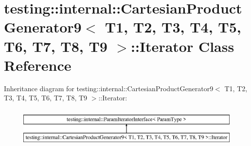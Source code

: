 \hypertarget{classtesting_1_1internal_1_1_cartesian_product_generator9_1_1_iterator}{}\section{testing\+:\+:internal\+:\+:Cartesian\+Product\+Generator9$<$ T1, T2, T3, T4, T5, T6, T7, T8, T9 $>$\+:\+:Iterator Class Reference}
\label{classtesting_1_1internal_1_1_cartesian_product_generator9_1_1_iterator}
Inheritance diagram for testing\+:\+:internal\+:\+:Cartesian\+Product\+Generator9$<$ T1, T2, T3, T4, T5, T6, T7, T8, T9 $>$\+:\+:Iterator\+:\begin{figure}[H]
\begin{center}
\leavevmode
\includegraphics[height=2.000000cm]{classtesting_1_1internal_1_1_cartesian_product_generator9_1_1_iterator}
\end{center}
\end{figure}

